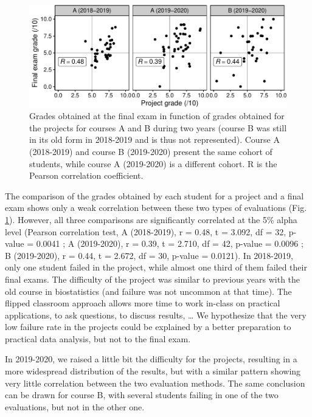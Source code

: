 \documentclass{aims}
\theoremstyle{definition}
\begin{document}
\begin{figure}
\includegraphics[width=1\linewidth]{teaching_data_science_files/figure-latex/fig_exams_projects-1} \caption{\label{fig:fig_exams_projects}  Grades obtained at the final exam in function of grades obtained for the projects for courses A and B during two years (course B was still in its old form in 2018-2019 and is thus not represented). Course A (2018-2019) and course B (2019-2020) present the same cohort of students, while course A (2019-2020) is a different cohort. R is the Pearson correlation coefficient.}\label{fig:fig_exams_projects}
\end{figure}

The comparison of the grades obtained by each student for a project and
a final exam shows only a weak correlation between these two types of
evaluations (Fig. \ref {fig:fig_exams_projects}). However, all three
comparisons are significantly correlated at the 5\% alpha level (Pearson
correlation test, A (2018-2019), r = 0.48, t = 3.092, df = 32, p-value =
0.0041 ; A (2019-2020), r = 0.39, t = 2.710, df = 42, p-value = 0.0096 ;
B (2019-2020), r = 0.44, t = 2.672, df = 30, p-value = 0.0121). In
2018-2019, only one student failed in the project, while almost one
third of them failed their final exams. The difficulty of the project
was similar to previous years with the old course in biostatistics (and
failure was not uncommon at that time). The flipped classroom approach
allows more time to work in-class on practical applications, to ask
questions, to discuss results, \ldots{} We hypothesize that the very low
failure rate in the projects could be explained by a better preparation
to practical data analysis, but not to the final exam.

In 2019-2020, we raised a little bit the difficulty for the projects,
resulting in a more widespread distribution of the results, but with a
similar pattern showing very little correlation between the two
evaluation methods. The same conclusion can be drawn for course B, with
several students failing in one of the two evaluations, but not in the
other one.
\end{document}
